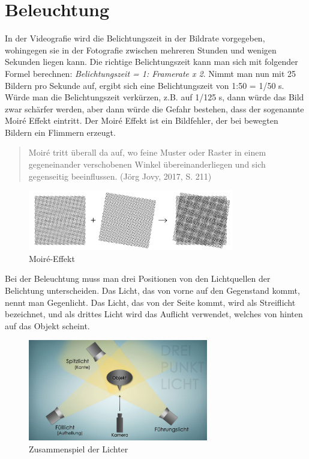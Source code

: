 \section{Beleuchtung}
In der Videografie wird die Belichtungszeit in der Bildrate vorgegeben, wohingegen sie in der Fotografie zwischen mehreren Stunden und wenigen Sekunden liegen kann.
Die richtige Belichtungszeit kann man sich mit folgender Formel berechnen: \textit{Belichtungszeit = 1: Framerate x 2}. Nimmt man nun mit 25 Bildern pro Sekunde auf, ergibt sich eine Belichtungszeit von 1:50 = 1/50 s. Würde man die Belichtungszeit verkürzen, z.B. auf 1/125 s, dann würde das Bild zwar schärfer werden, aber dann würde die Gefahr bestehen, dass der sogenannte Moir\'{e} Effekt eintritt. Der Moir\'{e} Effekt ist ein Bildfehler, der bei bewegten Bildern ein Flimmern erzeugt. \begin{quote}Moir\'{e} tritt überall da auf, wo feine Muster oder Raster in einem gegeneinander verschobenen Winkel übereinanderliegen und sich gegenseitig beeinflussen. (Jörg Jovy, 2017, S. 211)\end{quote}
\begin{figure}[H]
	\centering
	\includegraphics[width=0.8\textwidth]{abb2} 
	\caption[Moir\'{e}-Effekt]{Moir\'{e}-Effekt\footnotemark}
\end{figure}
Bei der Beleuchtung muss man drei Positionen von den Lichtquellen der Belichtung unterscheiden. Das Licht, das von vorne auf den Gegenstand kommt, nennt man Gegenlicht. Das Licht, das von der Seite kommt, wird als Streiflicht bezeichnet, und als drittes Licht wird das Auflicht verwendet, welches von hinten auf das Objekt scheint.\citep{beleuchtung}
\begin{figure}[H]
	\centering
	\includegraphics[width=0.7\textwidth]{abb3}
	\caption[Zusammenspiel der Lichter]{Zusammenspiel der Lichter\footnotemark}\label{fig:abb3}
\end{figure}
